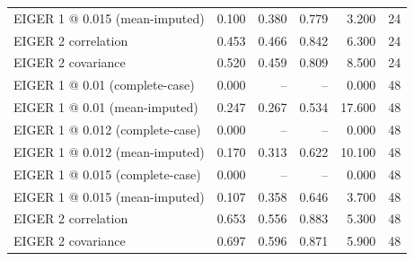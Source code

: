 \begin{table}[htbp]
{\begin{tabular}{lrrrrr}
EIGER 1 @ 0.015 (mean-imputed) & 0.100 & 0.380 & 0.779 & 3.200 & 24 \\
EIGER 2 correlation & 0.453 & 0.466 & 0.842 & 6.300 & 24 \\
EIGER 2 covariance & 0.520 & 0.459 & 0.809 & 8.500 & 24 \\
EIGER 1 @ 0.01 (complete-case) & 0.000 & -- & -- & 0.000 & 48 \\
EIGER 1 @ 0.01 (mean-imputed) & 0.247 & 0.267 & 0.534 & 17.600 & 48 \\
EIGER 1 @ 0.012 (complete-case) & 0.000 & -- & -- & 0.000 & 48 \\
EIGER 1 @ 0.012 (mean-imputed) & 0.170 & 0.313 & 0.622 & 10.100 & 48 \\
EIGER 1 @ 0.015 (complete-case) & 0.000 & -- & -- & 0.000 & 48 \\
EIGER 1 @ 0.015 (mean-imputed) & 0.107 & 0.358 & 0.646 & 3.700 & 48 \\
EIGER 2 correlation & 0.653 & 0.556 & 0.883 & 5.300 & 48 \\
EIGER 2 covariance & 0.697 & 0.596 & 0.871 & 5.900 & 48 \\
\bottomrule
\end{tabular}%
}
\end{table}
